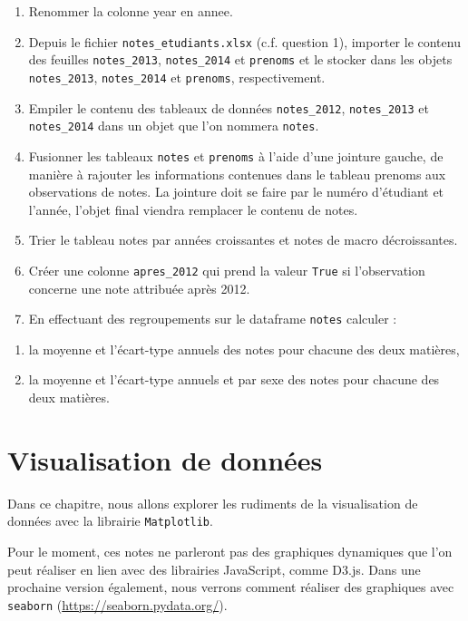 \documentclass[
  12pt,
]{book}
\makeatletter
\providecommand{\tightlist}{%
  \setlength{\itemsep}{0pt}\setlength{\parskip}{0pt}}
\numberwithin{equation}{section}
\numberwithin{countremarque}{section}
\newenvironment{exframe}{%
 \def\at@end@of@exframe{}%
 \ifinner\ifhmode%
  \def\at@end@of@exframe{\end{minipage}}%
  \begin{minipage}{\columnwidth}%
 \fi\fi%
 \def\FrameCommand##1{\hskip\@totalleftmargin \hskip-\fboxsep
 \colorbox{shadecolorex}{##1}\hskip-\fboxsep
     \hskip-\linewidth \hskip-\@totalleftmargin \hskip\columnwidth}%
 \MakeFramed {\advance\hsize-\width
   \@totalleftmargin\z@ \linewidth\hsize
   \@setminipage}}%
 {\par\unskip\endMakeFramed%
 \at@end@of@exframe}
\makeatother
\begin{document}
\begin{exframe}
\begin{enumerate}
\def\labelenumi{\arabic{enumi}.}
\setcounter{enumi}{9}
\tightlist
\item
  Renommer la colonne year en annee.
\item
  Depuis le fichier \texttt{notes\_etudiants.xlsx} (c.f. question 1), importer le contenu des feuilles \texttt{notes\_2013}, \texttt{notes\_2014} et \texttt{prenoms} et le stocker dans les objets \texttt{notes\_2013}, \texttt{notes\_2014} et \texttt{prenoms}, respectivement.
\item
  Empiler le contenu des tableaux de données \texttt{notes\_2012}, \texttt{notes\_2013} et \texttt{notes\_2014} dans un objet que l'on nommera \texttt{notes}.
\item
  Fusionner les tableaux \texttt{notes} et \texttt{prenoms} à l'aide d'une jointure gauche, de manière à rajouter les informations contenues dans le tableau prenoms aux observations de notes. La jointure doit se faire par le numéro d'étudiant et l'année, l'objet final viendra remplacer le contenu de notes.
\item
  Trier le tableau notes par années croissantes et notes de macro décroissantes.
\item
  Créer une colonne \texttt{apres\_2012} qui prend la valeur \texttt{True} si l'observation concerne une note attribuée après 2012.
\item
  En effectuant des regroupements sur le dataframe \texttt{notes} calculer :
\end{enumerate}

\begin{enumerate}
\def\labelenumi{(\alph{enumi})}
\tightlist
\item
  la moyenne et l'écart-type annuels des notes pour chacune des deux matières,
\item
  la moyenne et l'écart-type annuels et par sexe des notes pour chacune des deux matières.
\end{enumerate}
\end{exframe}

\chapter{Visualisation de données}\label{visualisation-de-donnuxe9es}

Dans ce chapitre, nous allons explorer les rudiments de la visualisation de données avec la librairie \texttt{Matplotlib}.

Pour le moment, ces notes ne parleront pas des graphiques dynamiques que l'on peut réaliser en lien avec des librairies JavaScript, comme D3.js. Dans une prochaine version également, nous verrons comment réaliser des graphiques avec \texttt{seaborn} (\url{https://seaborn.pydata.org/}).
\end{document}
